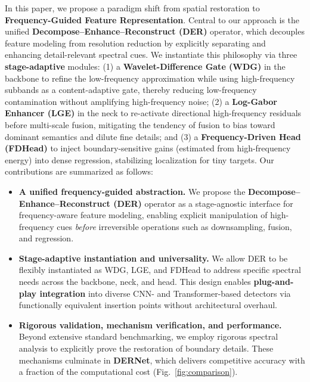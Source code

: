 \documentclass{article}
\theoremstyle{plain}
\theoremstyle{definition}
\theoremstyle{remark}
\begin{document}
In this paper, we propose a paradigm shift from spatial restoration to \textbf{Frequency-Guided Feature Representation}. Central to our approach is the unified \textbf{Decompose--Enhance--Reconstruct (DER)} operator, which decouples feature modeling from resolution reduction by explicitly separating and enhancing detail-relevant spectral cues. 
We instantiate this philosophy via three \textbf{stage-adaptive} modules: 
(1) a \textbf{Wavelet-Difference Gate (WDG)} in the backbone to refine the low-frequency approximation while using high-frequency subbands as a content-adaptive gate, thereby reducing low-frequency contamination without amplifying high-frequency noise;
(2) a \textbf{Log-Gabor Enhancer (LGE)} in the neck to re-activate directional high-frequency residuals before multi-scale fusion, mitigating the tendency of fusion to bias toward dominant semantics and dilute fine details; 
and (3) a \textbf{Frequency-Driven Head (FDHead)} to inject boundary-sensitive gains (estimated from high-frequency energy) into dense regression, stabilizing localization for tiny targets.
Our contributions are summarized as follows:
\vspace{-0.5cm}
\begin{itemize}
  \setlength{\topsep}{-14pt}
  \setlength{\partopsep}{-9pt}
  \setlength{\itemsep}{1pt}
  \setlength{\parskip}{0pt}
  \setlength{\parsep}{0pt}
  \setlength{\leftmargin}{0pt}
\item \textbf{A unified frequency-guided abstraction.}
We propose the \textbf{Decompose--Enhance--Reconstruct (DER)} operator as a
stage-agnostic interface for frequency-aware feature modeling, enabling explicit
manipulation of high-frequency cues \emph{before} irreversible operations such
as downsampling, fusion, and regression.

\item \textbf{Stage-adaptive instantiation and universality.}
We allow DER to be flexibly instantiated as WDG, LGE, and FDHead to address
specific spectral needs across the backbone, neck, and head. This design enables
\textbf{plug-and-play integration} into diverse CNN- and Transformer-based
detectors via functionally equivalent insertion points without architectural
overhaul.

\item \textbf{Rigorous validation, mechanism verification, and performance.}
Beyond extensive standard benchmarking, we employ rigorous spectral analysis to explicitly prove the restoration of boundary details. 
These mechanisms culminate in \textbf{DERNet}, which delivers competitive accuracy with a fraction of the computational cost (Fig.~\ref{fig:comparison}).

\end{itemize}
\end{document}
